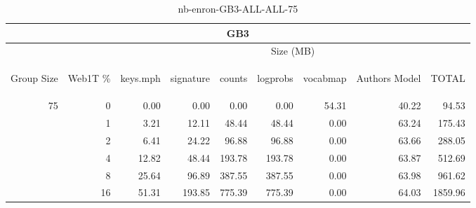 \begin{center}
\begin{table}[htbp] 
 \begin{center}
\begin{tabular}{ | r | r | r | r | r | r | r | r | r |}
\hline
\multicolumn{9}{|c|}{GB3}\\
\hline
 & & \multicolumn{7}{|c|}{Size (MB)}\\ \cline{3-9}
\begin{sideways}Group Size\end{sideways} & \begin{sideways}Web1T \% \end{sideways} & \begin{sideways}keys.mph\end{sideways} & \begin{sideways}signature\end{sideways} & \begin{sideways}counts\end{sideways} & \begin{sideways}logprobs\end{sideways} & \begin{sideways}vocabmap\end{sideways} & \begin{sideways}Authors Model \end{sideways} & \begin{sideways}TOTAL\end{sideways}\\
\hline
\multirow{5}{*}{75}
 & 0 & 0.00 & 0.00 & 0.00 & 0.00 & 54.31 & 40.22 & 94.53\\ \cline{2-9}
 & 1 & 3.21 & 12.11 & 48.44 & 48.44 & 0.00 & 63.24 & 175.43\\ \cline{2-9}
 & 2 & 6.41 & 24.22 & 96.88 & 96.88 & 0.00 & 63.66 & 288.05\\ \cline{2-9}
 & 4 & 12.82 & 48.44 & 193.78 & 193.78 & 0.00 & 63.87 & 512.69\\ \cline{2-9}
 & 8 & 25.64 & 96.89 & 387.55 & 387.55 & 0.00 & 63.98 & 961.62\\ \cline{2-9}
 & 16 & 51.31 & 193.85 & 775.39 & 775.39 & 0.00 & 64.03 & 1859.96\\ \cline{2-9}
\hline
\end{tabular}
\caption{nb-enron-GB3-ALL-ALL-75}
\label{table:nb-enron-GB3-ALL-ALL-75}
\end{center}
 \end{table}
\end{center}

